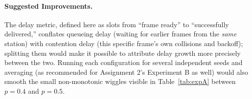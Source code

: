 \documentclass[11pt]{article}
\begin{document}
\paragraph{Suggested Improvements.} The delay metric, defined here as slots from
``frame ready'' to ``successfully delivered,'' conflates queueing delay (waiting for earlier
frames from the \emph{same} station) with contention delay (this specific frame's own
collisions and backoff); splitting them would make it possible to attribute delay growth
more precisely between the two. Running each configuration for several independent seeds and
averaging (as recommended for Assignment 2's Experiment B as well) would also smooth the
small non-monotonic wiggles visible in Table~\ref{tab:expA} between $p{=}0.4$ and $p{=}0.5$.
\end{document}
